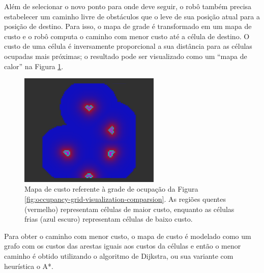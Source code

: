 Além de selecionar o novo ponto para onde deve seguir, o robô também 
precisa estabelecer um caminho livre de obstáculos que o leve de sua 
posição atual para a posição de destino. Para isso, o mapa de grade é 
transformado em um mapa de custo e o robô computa o caminho com menor custo até a célula de destino. O custo de uma célula é inversamente 
proporcional a sua distância para as células ocupadas mais próximas; o 
resultado pode ser visualizado como um ``mapa de calor'' na Figura 
\ref{fig:costmap}.

\begin{figure}
  \centering
  \includegraphics[width=0.6\textwidth]{figs/costmap.png}
  \caption[Mapa de custo de ocupação]{Mapa de custo referente à grade de ocupação da Figura \ref{fig:occupancy-grid-visualization-comparsion}. As regiões quentes (vermelho) representam células de maior custo, enquanto as células 
  frias (azul escuro) representam células de baixo custo.}
  \label{fig:costmap}
\end{figure}

Para obter o caminho com menor custo, o mapa de custo é modelado como 
um grafo com os custos das arestas iguais aos custos da células e então 
o menor caminho é obtido utilizando o algoritmo de Dijkstra, ou sua 
variante com heurística o A*.